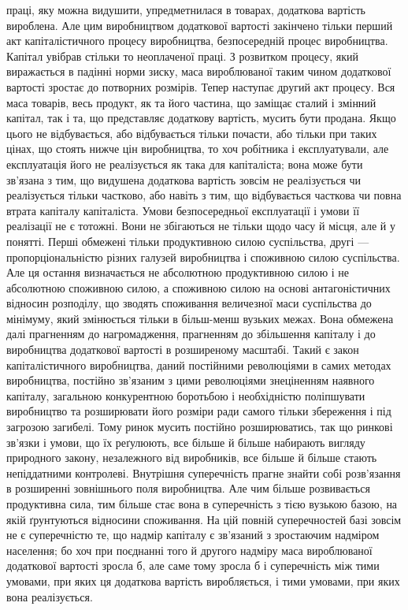 \parcont{}  %
праці, яку можна видушити, упредметнилася в товарах, додаткова
вартість вироблена. Але цим виробництвом додаткової
вартості закінчено тільки перший акт капіталістичного процесу
виробництва, безпосередній процес виробництва. Капітал увібрав
стільки то неоплаченої праці. З розвитком процесу, який виражається
в падінні норми зиску, маса вироблюваної таким чином
додаткової вартості зростає до потворних розмірів. Тепер
наступає другий акт процесу. Вся маса товарів, весь продукт,
як та його частина, що заміщає сталий і змінний капітал, так
і та, що представляє додаткову вартість, мусить бути продана.
Якщо цього не відбувається, або відбувається тільки почасти,
або тільки при таких цінах, що стоять нижче цін виробництва,
то хоч робітника і експлуатували, але експлуатація його не
реалізується як така для капіталіста; вона може бути зв’язана
з тим, що видушена додаткова вартість зовсім не реалізується чи
реалізується тільки частково, або навіть з тим, що відбувається
часткова чи повна втрата капіталу капіталіста. Умови безпосередньої
експлуатації і умови її реалізації не є тотожні. Вони не
збігаються не тільки щодо часу й місця, але й у понятті. Перші
обмежені тільки продуктивною силою суспільства, другі — пропорціональністю
різних галузей виробництва і споживною силою
суспільства. Але ця остання визначається не абсолютною продуктивною
силою і не абсолютною споживною силою, а споживною
силою на основі антагоністичних відносин розподілу,
що зводять споживання величезної маси суспільства до мінімуму,
який змінюється тільки в більш-менш вузьких межах.
Вона обмежена далі прагненням до нагромадження, прагненням
до збільшення капіталу і до виробництва додаткової вартості
в розширеному масштабі. Такий є закон капіталістичного виробництва,
даний постійними революціями в самих методах виробництва,
постійно зв’язаним з цими революціями знеціненням
наявного капіталу, загальною конкурентною боротьбою і необхідністю
поліпшувати виробництво та розширювати його розміри
ради самого тільки збереження і під загрозою загибелі. Тому ринок
мусить постійно розширюватись, так що ринкові зв’язки і
умови, що їх реґулюють, все більше й більше набирають
вигляду природного закону, незалежного від виробників, все
більше й більше стають непіддатними контролеві. Внутрішня
суперечність прагне знайти собі розв’язання в розширенні зовнішнього
поля виробництва. Але чим більше розвивається продуктивна
сила, тим більше стає вона в суперечність з тією
вузькою базою, на якій ґрунтуються відносини споживання. На
цій повній суперечностей базі зовсім не є суперечністю те,
що надмір капіталу є зв’язаний з зростаючим надміром населення;
бо хоч при поєднанні того й другого надміру маса вироблюваної
додаткової вартості зросла б, але саме тому зросла б
і суперечність між тими умовами, при яких ця додаткова вартість
виробляється, і тими умовами, при яких вона реалізується.

